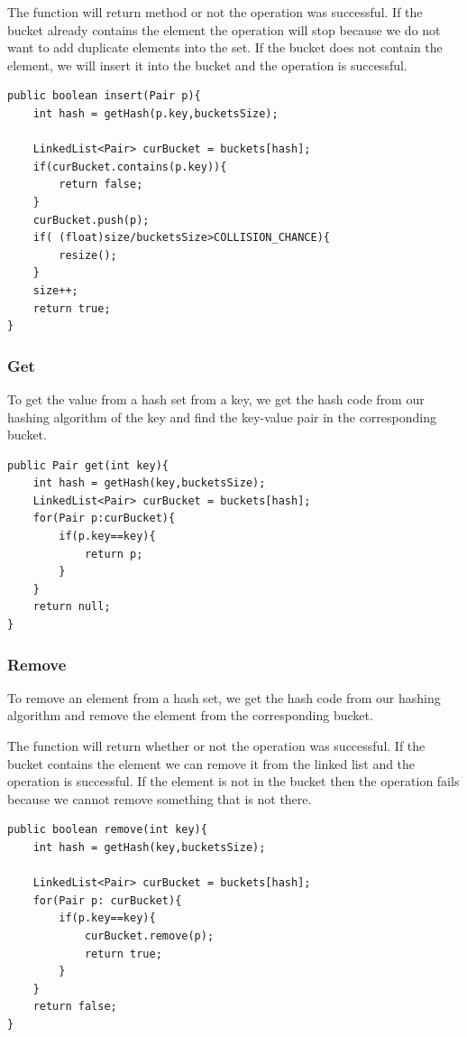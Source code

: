 \documentclass[11pt,oneside]{book}
\begin{document}
The function will return method or not the operation was successful. If the bucket already contains the element the operation will stop because we do not want to add duplicate elements into the set. If the bucket does not contain the element, we will insert it into the bucket and the operation is successful.

\begin{lstlisting}
public boolean insert(Pair p){
    int hash = getHash(p.key,bucketsSize);
    
    LinkedList<Pair> curBucket = buckets[hash];
    if(curBucket.contains(p.key)){
        return false;
    }
    curBucket.push(p);
    if( (float)size/bucketsSize>COLLISION_CHANCE){
        resize();
    }
    size++;
    return true;
}
\end{lstlisting}

\subsubsection{Get}

To get the value from a hash set from a key, we get the hash code from our hashing algorithm of the key and find the key-value pair in the corresponding bucket.

\begin{lstlisting}
public Pair get(int key){
    int hash = getHash(key,bucketsSize);
    LinkedList<Pair> curBucket = buckets[hash];
    for(Pair p:curBucket){
        if(p.key==key){
            return p;
        }
    }
    return null;
}
\end{lstlisting}

\subsubsection{Remove}

To remove an element from a hash set, we get the hash code from our hashing algorithm and remove the element from the corresponding bucket.

The function will return whether or not the operation was successful. If the bucket contains the element we can remove it from the linked list and the operation is successful. If the element is not in the bucket then the operation fails because we cannot remove something that is not there.

\begin{lstlisting}
public boolean remove(int key){
    int hash = getHash(key,bucketsSize);
    
    LinkedList<Pair> curBucket = buckets[hash];
    for(Pair p: curBucket){
        if(p.key==key){
            curBucket.remove(p);
            return true;
        }
    }
    return false;
}
\end{lstlisting}
\end{document}

